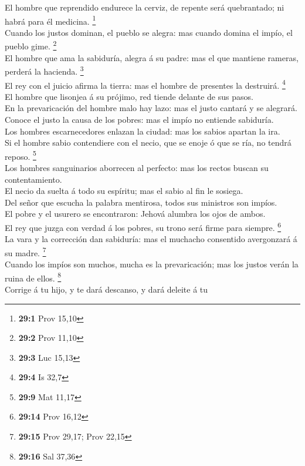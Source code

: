  El hombre que reprendido endurece la cerviz, de repente
será quebrantado; ni habrá para él medicina. \footnote{\textbf{29:1}
  Prov 15,10}\\
 Cuando los justos dominan, el pueblo se alegra: mas cuando
domina el impío, el pueblo gime. \footnote{\textbf{29:2} Prov 11,10}\\
 El hombre que ama la sabiduría, alegra á su padre: mas el
que mantiene rameras, perderá la hacienda. \footnote{\textbf{29:3} Luc
  15,13}\\
 El rey con el juicio afirma la tierra: mas el hombre de
presentes la destruirá. \footnote{\textbf{29:4} Is 32,7}\\
 El hombre que lisonjea á su prójimo, red tiende delante de
sus pasos.\\
 En la prevaricación del hombre malo hay lazo: mas el justo
cantará y se alegrará.\\
 Conoce el justo la causa de los pobres: mas el impío no
entiende sabiduría.\\
 Los hombres escarnecedores enlazan la ciudad: mas los
sabios apartan la ira.\\
 Si el hombre sabio contendiere con el necio, que se enoje ó
que se ría, no tendrá reposo. \footnote{\textbf{29:9} Mat 11,17}\\
 Los hombres sanguinarios aborrecen al perfecto: mas los
rectos buscan su contentamiento.\\
 El necio da suelta á todo su espíritu; mas el sabio al fin
le sosiega.\\
 Del señor que escucha la palabra mentirosa, todos sus
ministros son impíos.\\
 El pobre y el usurero se encontraron: Jehová alumbra los
ojos de ambos.\\
 El rey que juzga con verdad á los pobres, su trono será
firme para siempre. \footnote{\textbf{29:14} Prov 16,12}\\
 La vara y la corrección dan sabiduría: mas el muchacho
consentido avergonzará á su madre. \footnote{\textbf{29:15} Prov 29,17;
  Prov 22,15}\\
 Cuando los impíos son muchos, mucha es la prevaricación;
mas los justos verán la ruina de ellos. \footnote{\textbf{29:16} Sal
  37,36}\\
 Corrige á tu hijo, y te dará descanso, y dará deleite á tu
